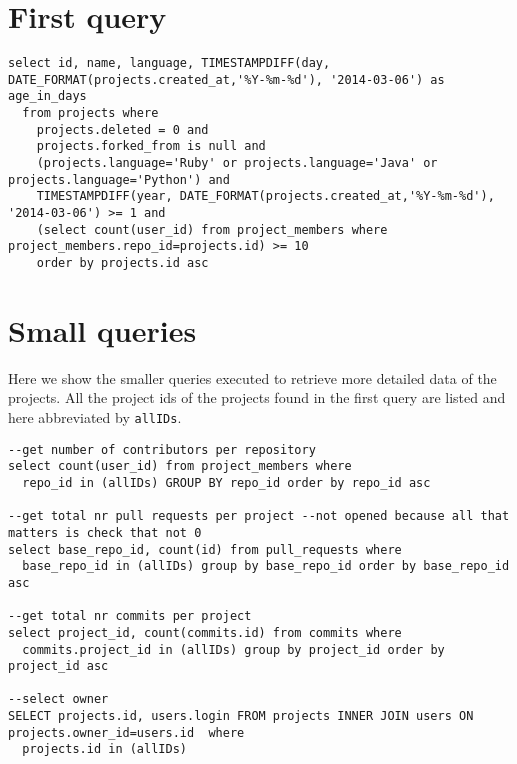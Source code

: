 \begin{appendices}
\section{First query} \label{app:firstquery}
\begin{scriptsize}
\begin{verbatim}
select id, name, language, TIMESTAMPDIFF(day, DATE_FORMAT(projects.created_at,'%Y-%m-%d'), '2014-03-06') as age_in_days 
  from projects where 
    projects.deleted = 0 and
    projects.forked_from is null and
    (projects.language='Ruby' or projects.language='Java' or projects.language='Python') and 
    TIMESTAMPDIFF(year, DATE_FORMAT(projects.created_at,'%Y-%m-%d'), '2014-03-06') >= 1 and 
    (select count(user_id) from project_members where project_members.repo_id=projects.id) >= 10 
    order by projects.id asc
\end{verbatim}
\end{scriptsize}

\section{Small queries} \label{app:smallqueries}
Here we show the smaller queries executed to retrieve more detailed data of the projects. All the project ids of the projects found in the first query are listed and here abbreviated by \texttt{allIDs}.
\begin{scriptsize}
\begin{verbatim}
--get number of contributors per repository
select count(user_id) from project_members where 
  repo_id in (allIDs) GROUP BY repo_id order by repo_id asc
	
--get total nr pull requests per project --not opened because all that matters is check that not 0
select base_repo_id, count(id) from pull_requests where 
  base_repo_id in (allIDs) group by base_repo_id order by base_repo_id asc

--get total nr commits per project
select project_id, count(commits.id) from commits where 
  commits.project_id in (allIDs) group by project_id order by project_id asc

--select owner
SELECT projects.id, users.login FROM projects INNER JOIN users ON projects.owner_id=users.id  where 
  projects.id in (allIDs) 
\end{verbatim}
\end{scriptsize}


\end{appendices}
